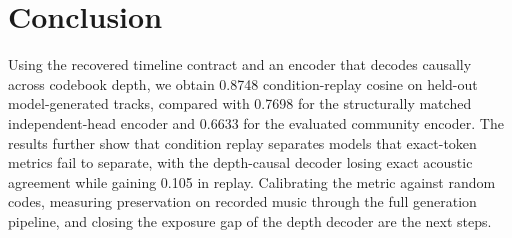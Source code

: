 \section{Conclusion}

Using the recovered timeline contract and an encoder that decodes causally across codebook depth, we obtain 0.8748 condition-replay cosine on held-out model-generated tracks, compared with 0.7698 for the structurally matched independent-head encoder and 0.6633 for the evaluated community encoder. The results further show that condition replay separates models that exact-token metrics fail to separate, with the depth-causal decoder losing exact acoustic agreement while gaining 0.105 in replay. Calibrating the metric against random codes, measuring preservation on recorded music through the full generation pipeline, and closing the exposure gap of the depth decoder are the next steps.
